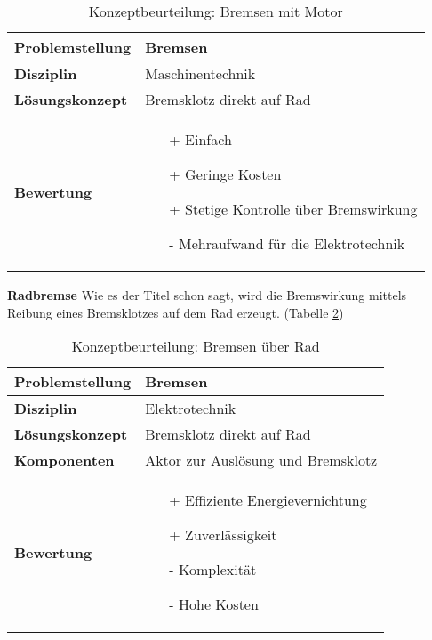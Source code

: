 \documentclass[../../main.tex]{subfiles}
\begin{document}
    \begin{flushleft}
        \begin{table}[h]
        \begin{tabular}{ | l | p{11cm} |}
        \hline
        \textbf{Problemstellung} & Bremsen \\ \hline
        \textbf{Disziplin} & Maschinentechnik \\ \hline
        \textbf{Lösungskonzept} & Bremsklotz direkt auf Rad \\ \hline
        \textbf{Bewertung} &  \begin{itemize}
                                \item[+] Einfach
                                \item[+] Geringe Kosten
                                \item[+] Stetige Kontrolle über Bremswirkung 
                                \item[-] Mehraufwand für die Elektrotechnik 
                              \end{itemize} \\ \hline
        \end{tabular}
        \caption{Konzeptbeurteilung: Bremsen mit Motor}
        \label{tab:konzept_fahrwerk_motorbremse}
    \end{table}
    \end{flushleft}

    \textbf{Radbremse}
    Wie es der Titel schon sagt, wird die Bremswirkung mittels Reibung eines Bremsklotzes auf dem Rad erzeugt. (Tabelle \ref{tab:konzept_fahrwerk_radbremse})

\begin{flushleft}
    \begin{table}[h]
    \begin{tabular}{ | l | p{11cm} |}
    \hline
    \textbf{Problemstellung} & Bremsen \\ \hline
    \textbf{Disziplin} & Elektrotechnik \\ \hline
    \textbf{Lösungskonzept} & Bremsklotz direkt auf Rad \\ \hline
    \textbf{Komponenten} & Aktor zur Auslösung und Bremsklotz \\ \hline
    \textbf{Bewertung} &  \begin{itemize}
                            \item[+] Effiziente Energievernichtung
                            \item[+] Zuverlässigkeit
                            \item[-] Komplexität 
                            \item[-] Hohe Kosten
                          \end{itemize} \\ \hline
    \end{tabular}
    \caption{Konzeptbeurteilung: Bremsen über Rad}
    \label{tab:konzept_fahrwerk_radbremse}
\end{table}
\end{flushleft}
\end{document}
